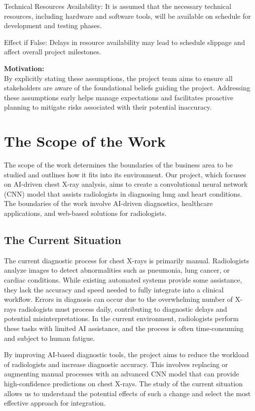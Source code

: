 \documentclass[12pt]{article}
\begin{document}
Technical Resources Availability: It is assumed that the necessary technical resources, including 
hardware and software tools, will be available on schedule for development and testing phases.

Effect if False: Delays in resource availability may lead to schedule slippage and affect overall 
project milestones.

\textbf{Motivation:}\\
By explicitly stating these assumptions, the project team aims to ensure all stakeholders are 
aware of the foundational beliefs guiding the project. Addressing these assumptions early helps 
manage expectations and facilitates proactive planning to mitigate risks associated with their 
potential inaccuracy.

\section{The Scope of the Work}
The scope of the work determines the boundaries of the business area to be studied and outlines 
how it fits into its environment. Our project, which focuses on AI-driven chest X-ray analysis, 
aims to create a convolutional neural network (CNN) model that assists radiologists in diagnosing 
lung and heart conditions. The boundaries of the work involve AI-driven diagnostics, healthcare 
applications, and web-based solutions for radiologists.

\subsection{The Current Situation}
The current diagnostic process for chest X-rays is primarily manual. Radiologists analyze images 
to detect abnormalities such as pneumonia, lung cancer, or cardiac conditions. While existing 
automated systems provide some assistance, they lack the accuracy and speed needed to fully 
integrate into a clinical workflow. Errors in diagnosis can occur due to the overwhelming number
of X-rays radiologists must process daily, contributing to diagnostic delays and potential 
misinterpretations. In the current environment, radiologists perform these tasks with limited AI 
assistance, and the process is often time-consuming and subject to human fatigue.

By improving AI-based diagnostic tools, the project aims to reduce the workload of radiologists 
and increase diagnostic accuracy. This involves replacing or augmenting manual processes with an 
advanced CNN model that can provide high-confidence predictions on chest X-rays. The study of the 
current situation allows us to understand the potential effects of such a change and select the 
most effective approach for integration.
\end{document}

